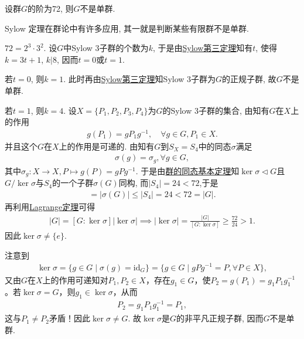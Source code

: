 \documentclass[../../main.tex]{subfiles}%
\begin{document}
\begin{example}
设群$G$的阶为72, 则$G$不是单群.
\end{example}
\begin{remark}
Sylow 定理在群论中有许多应用, 其一就是判断某些有限群不是单群.
\end{remark}
\begin{solution}

$72=2^3\cdot 3^2$. 设$G$中Sylow 3子群的个数为$k$, 于是由\hyperref[theorem:Sylow第三定理]{Sylow第三定理}知有$t$, 使得$k=3t+1$, $k|8$, 因而$t=0$或$t=1$.

若$t=0$, 则$k=1$. 此时再由\hyperref[theorem:Sylow第三定理]{Sylow第三定理}知Sylow 3子群为$G$的正规子群, 故$G$不是单群.

若$t=1$, 则$k=4$. 设$X=\{P_1,P_2,P_3,P_4\}$为$G$的Sylow 3子群的集合, 由知有$G$在$X$上的作用
\begin{align*}
g(P_1)=gP_1g^{-1}, \quad \forall g\in G, P_1\in X.
\end{align*}
并且这个$G$在$X$上的作用是可递的.
由知有$G$到$S_X=S_4$中的同态$\sigma$满足
\begin{align*}
\sigma \left( g \right) =\sigma _g,\forall g\in G,
\end{align*}
其中$\sigma _g:X\rightarrow X,P\longmapsto g\left( P \right) =gPg^{-1}.$
于是由\hyperref[theorem:群的同态基本定理]{群的同态基本定理}知$\ker \sigma \lhd G$且$G/\ker\sigma$与$S_4$的一个子群$\sigma(G)$同构, 而$|S_4|=24<72$,于是
\begin{align*}
[G:\ker\sigma] = |\sigma(G)| \leqslant |S_4| = 24 < 72 = |G|.
\end{align*}
再利用\hyperref[theorem:抽象代数--Lagrange定理]{Lagrange定理}可得
\begin{align*}
|G| = [G:\ker\sigma]|\ker\sigma| \implies |\ker\sigma| = \frac{|G|}{[G:\ker\sigma]} \geqslant \frac{72}{24} > 1.
\end{align*}
因此$\ker\sigma \neq \{e\}$.

注意到
\begin{align*}
\ker\sigma = \{ g \in G \mid \sigma(g) = \mathrm{id}_G \} = \{ g \in G \mid gPg^{-1} = P, \forall P \in X \},
\end{align*}
又由$G$在$X$上的作用可递知对$P_1,P_2 \in X$，存在$g_1 \in G$，使$P_2 = g(P_1) = g_1P_1g_1^{-1}$。若$\ker\sigma = G$，则$g_1 \in \ker\sigma$，从而
\begin{align*}
P_2 = g_1P_1g_1^{-1} = P_1,
\end{align*}
这与$P_1 \neq P_2$矛盾！因此$\ker \sigma\neq G$. 故$\ker\sigma$是$G$的非平凡正规子群, 因而$G$不是单群.

\end{solution}
\end{document}
